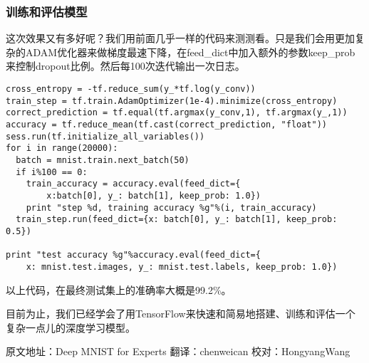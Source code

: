 \subsubsection{训练和评估模型}

这次效果又有多好呢？我们用前面几乎一样的代码来测测看。只是我们会用更加复杂的ADAM优化器来做梯度最速下降，在feed\_dict中加入额外的参数keep\_prob来控制dropout比例。然后每100次迭代输出一次日志。

\begin{lstlisting}
cross_entropy = -tf.reduce_sum(y_*tf.log(y_conv))
train_step = tf.train.AdamOptimizer(1e-4).minimize(cross_entropy)
correct_prediction = tf.equal(tf.argmax(y_conv,1), tf.argmax(y_,1))
accuracy = tf.reduce_mean(tf.cast(correct_prediction, "float"))
sess.run(tf.initialize_all_variables())
for i in range(20000):
  batch = mnist.train.next_batch(50)
  if i%100 == 0:
    train_accuracy = accuracy.eval(feed_dict={
        x:batch[0], y_: batch[1], keep_prob: 1.0})
    print "step %d, training accuracy %g"%(i, train_accuracy)
  train_step.run(feed_dict={x: batch[0], y_: batch[1], keep_prob: 0.5})

print "test accuracy %g"%accuracy.eval(feed_dict={
    x: mnist.test.images, y_: mnist.test.labels, keep_prob: 1.0})
\end{lstlisting}

以上代码，在最终测试集上的准确率大概是99.2\%。

目前为止，我们已经学会了用TensorFlow来快速和简易地搭建、训练和评估一个复杂一点儿的深度学习模型。

原文地址：Deep MNIST for Experts
翻译：chenweican
校对：HongyangWang
